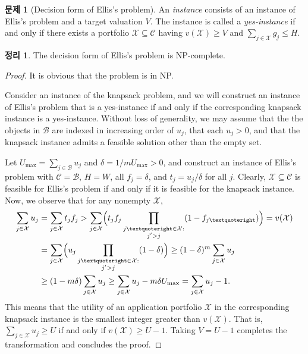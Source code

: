 \documentclass[12pt]{article} %
\newtheorem{theorem}{Theorem}
\theoremstyle{definition}
\newtheorem{problem}{Problem}
\newtheorem{theorem}{정리}
\theoremstyle{definition}
\newtheorem{problem}{문제}
\begin{document}
\begin{problem}[Decision form of Ellis’s problem]
An \emph{instance} consists of an instance of Ellis’s problem and a target valuation $V$. The instance is called a \emph{yes-instance} if and only if there exists a portfolio $\mathcal{X} \subseteq \mathcal{C}$ having $v(\mathcal{X}) \geq V$ and  $\sum_{j \in \mathcal{X}} g_j \leq H$.
\end{problem}

\begin{theorem}
The decision form of Ellis’s problem is NP-complete.
\end{theorem}

\begin{proof}It is obvious that the problem is in NP.

Consider an instance of the knapsack problem, and we will construct an instance of Ellis’s problem that is a yes-instance if and only if the corresponding knapsack instance is a yes-instance. Without loss of generality, we may assume that the the objects in $\mathcal{B}$ are indexed in increasing order of $u_j$, that each $u_j >0$, and that the knapsack instance admits a feasible solution other than the empty set. 

Let $U_{\mathrm{max}} = \sum_{j \in \mathcal{B}} u_j$ and $\delta = {1} /{m U_{\mathrm{max}}} > 0$, and construct an instance of Ellis’s problem with $\mathcal{C} = \mathcal{B}$, $H = W$, all $f_j = \delta$, and $t_j = u_j / \delta$ for all $j$. Clearly, $\mathcal{X} \subseteq \mathcal{C}$ is feasible for Ellis’s problem if and only if it is feasible for the knapsack instance. Now, we observe that for any nonempty $\mathcal{X}$,
\begin{align}
\begin{split}
\sum_{j \in \mathcal{X}} u_j &=  \sum_{j \in \mathcal{X}} t_j f_j 
> \sum_{j \in \mathcal{X}} \Bigl( t_j f_j  \prod_{\substack{j’ \in \mathcal{X}: \\ j' > j}} (1 - f_{j’}) \Bigr)
= v(\mathcal{X}) \\
&= \sum_{j \in \mathcal{X}} \Bigl( u_j  \prod_{\substack{j’ \in \mathcal{X}: \\ j' > j}} (1 - \delta) \Bigr)
\geq (1 - \delta)^m \sum_{j \in \mathcal{X}} u_j \\
&\geq (1 - m\delta) \sum_{j \in \mathcal{X}} u_j 
\geq \sum_{j \in \mathcal{X}} u_j  - m\delta U_{\mathrm{max}}
= \sum_{j \in \mathcal{X}} u_j  - 1.
\end{split}
\end{align}
This means that the utility of an application portfolio $\mathcal{X}$ in the corresponding knapsack instance is the smallest integer greater than $v( \mathcal{X})$. That is, $\sum_{j \in \mathcal{X}} u_j \geq U$ if and only if $v(\mathcal{X}) \geq U -1$. Taking $V = U-1$ completes the transformation and concludes the proof.  \end{proof}
\end{document}

